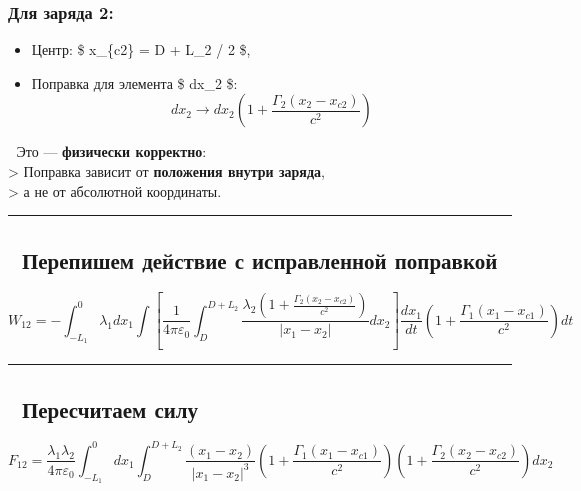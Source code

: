 \documentclass[11pt]{article}
\providecommand{\tightlist}{%
      \setlength{\itemsep}{0pt}\setlength{\parskip}{0pt}}
\begin{document}
\subsubsection{Для заряда
2:}\label{ux434ux43bux44f-ux437ux430ux440ux44fux434ux430-2}

\begin{itemize}
\tightlist
\item
  Центр: \$ x\_\{c2\} = D + L\_2 / 2 \$,
\item
  Поправка для элемента \$ dx\_2 \$:\\
  \[
  dx_2 \to dx_2 \left( 1 + \frac{\Gamma_2 (x_2 - x_{c2})}{c^2} \right)
  \]
\end{itemize}

📌 Это --- \textbf{физически корректно}:\\
\textgreater{} Поправка зависит от \textbf{положения внутри заряда},\\
\textgreater{} а не от абсолютной координаты.

\begin{center}\rule{0.5\linewidth}{\linethickness}\end{center}

\subsection{🔁 Перепишем действие с исправленной
поправкой}\label{ux43fux435ux440ux435ux43fux438ux448ux435ux43c-ux434ux435ux439ux441ux442ux432ux438ux435-ux441-ux438ux441ux43fux440ux430ux432ux43bux435ux43dux43dux43eux439-ux43fux43eux43fux440ux430ux432ux43aux43eux439}

\[
W_{12} = - \int_{-L_1}^0 \lambda_1 dx_1 \int \left[ \frac{1}{4\pi\varepsilon_0} \int_{D}^{D+L_2} \frac{\lambda_2 \left(1 + \frac{\Gamma_2 (x_2 - x_{c2})}{c^2}\right)}{|x_1 - x_2|} dx_2 \right] \frac{dx_1}{dt} \left( 1 + \frac{\Gamma_1 (x_1 - x_{c1})}{c^2} \right) dt
\]

\begin{center}\rule{0.5\linewidth}{\linethickness}\end{center}

\subsection{🔁 Пересчитаем
силу}\label{ux43fux435ux440ux435ux441ux447ux438ux442ux430ux435ux43c-ux441ux438ux43bux443}

\[
F_{12} = \frac{\lambda_1 \lambda_2}{4\pi\varepsilon_0} \int_{-L_1}^0 dx_1 \int_{D}^{D+L_2} \frac{(x_1 - x_2)}{|x_1 - x_2|^3} \left(1 + \frac{\Gamma_1 (x_1 - x_{c1})}{c^2}\right) \left(1 + \frac{\Gamma_2 (x_2 - x_{c2})}{c^2}\right) dx_2
\]
\end{document}
